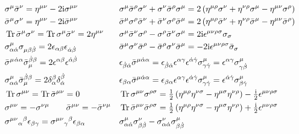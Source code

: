 \documentclass[CheatSheet]{subfiles}
\begin{document}
\begin{align*}
  &\sigma^{\mu}\bsigma^{\nu}=\eta^{\mu\nu}-2\ii \sigma^{\mu\nu}&
  &\sigma^{\mu}\bsigma^{\rho}\sigma^{\nu}+\sigma^{\nu}\bsigma^{\rho}\sigma^{\mu}=2\left(\eta^{\mu\rho}\sigma^{\nu}+\eta^{\nu\rho}\sigma^{\mu}-\eta^{\mu\nu}\sigma^{\rho}\right)
\\
  &\bsigma^{\mu}\sigma^{\nu}=\eta^{\mu\nu}-2\ii \bsigma^{\mu\nu}&
  &\bsigma^{\mu}\sigma^{\rho}\bsigma^{\nu}+\bsigma^{\nu}\sigma^{\rho}\bsigma^{\mu}=2\left(\eta^{\mu\rho}\bsigma^{\nu}+\eta^{\nu\rho}\bsigma^{\mu}-\eta^{\mu\nu}\bsigma^{\rho}\right)
\\
  &\Tr\bsigma^{\mu}\sigma^{\nu}=\Tr\sigma^{\mu}\bsigma^{\nu}=2\eta^{\mu\nu}&
  &\sigma^{\mu}\bsigma^{\nu}\sigma^{\rho}-\sigma^{\rho}\bsigma^{\nu}\sigma^{\mu}=2\ii\epsilon^{\mu\nu\rho\sigma}\sigma_\sigma
\\
  &\sigma^{\mu}_{\alpha\dalpha}\sigma_{\mu\beta\dbeta}=2\epsilon_{\alpha\beta}\epsilon_{\dalpha\dbeta}&
  &\bsigma^{\mu}\sigma^{\nu}\bsigma^{\rho}-\bsigma^{\rho}\sigma^{\nu}\bsigma^{\mu}=-2\ii\epsilon^{\mu\nu\rho\sigma}\bsigma_{\sigma}
\\
  &\bsigma^{\mu}{}^{\dalpha\alpha}\bsigma_{\mu}^{\dbeta\beta}=2\epsilon^{\alpha\beta}\epsilon^{\dalpha\dbeta}&
  &\epsilon_{\dbeta\dalpha}\bsigma^{\mu\dalpha\alpha}=\epsilon_{\dbeta\dalpha}\epsilon^{\alpha\gamma}\epsilon^{\dalpha\dgamma}\sigma^\mu_{\gamma\dgamma}
    =\epsilon^{\alpha\gamma}\sigma^{\mu}_{\gamma\dbeta}
\\
  &\sigma^{\mu}_{\alpha\dalpha}\bsigma_{\mu}^{\dbeta\beta}=2\delta^\beta_\alpha\delta^\dbeta_\dalpha&
  &\epsilon_{\beta\alpha}\bsigma^{\mu\dalpha\alpha} =\epsilon_{\beta\alpha}\epsilon^{\alpha\gamma}\epsilon^{\dalpha\dgamma}\sigma^\mu_{\gamma\dgamma}
   =\epsilon^{\dalpha\dgamma}\sigma^{\mu}_{\beta\dgamma}
\\
  &\Tr\sigma^{\mu\nu}=\Tr\bsigma^{\mu\nu}=0&
  &\Tr\sigma^{\mu\nu}\sigma^{\rho\sigma}=\tfrac12\left(\eta^{\mu\rho}\eta^{\nu\sigma}-\eta^{\mu\sigma}\eta^{\nu\rho}\right)-\tfrac\ii2\epsilon^{\mu\nu\rho\sigma}
\\
  &\sigma^{\mu\nu}=-\sigma^{\nu\mu}
   \qquad
   \bsigma^{\mu\nu}=-\bsigma^{\nu\mu}&
  &\Tr\bsigma^{\mu\nu}\bsigma^{\rho\sigma}=\tfrac12\left(\eta^{\mu\rho}\eta^{\nu\sigma}-\eta^{\mu\sigma}\eta^{\nu\rho}\right)+\tfrac\ii2\epsilon^{\mu\nu\rho\sigma}
\\
  &\sigma^{\mu\nu}{}_\alpha{}^\beta\epsilon_{\beta\gamma} =  \sigma^{\mu\nu}{}_\gamma{}^\beta\epsilon_{\beta\alpha}&
  &\sigma^{\mu}_{\alpha\dalpha}\sigma^{\nu}_{\beta\dbeta}-\sigma^{\nu}_{\alpha\dalpha}\sigma^{\mu}_{\beta\dbeta}

\end{align*}
\end{document}
